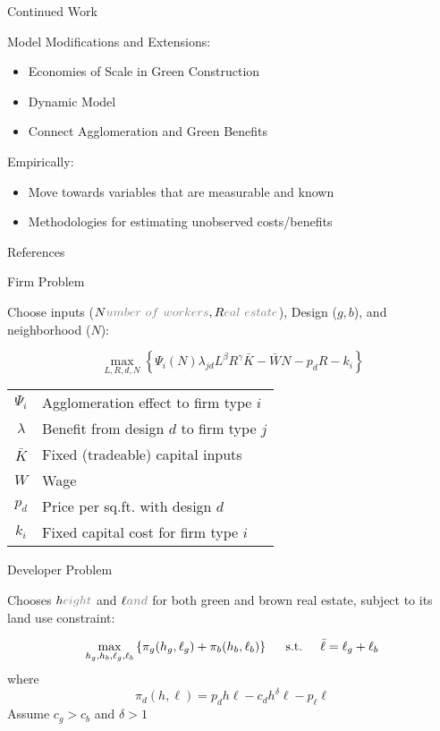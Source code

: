 \documentclass[11pt, dvipsnames, usenames]{beamer}
\begin{document}
\begin{frame}{Continued Work}

Model Modifications and Extensions:
\begin{itemize}
	\item Economies of Scale in Green Construction
	\item Dynamic Model
	\item Connect Agglomeration and Green Benefits
\end{itemize}

\vfill
Empirically:
\begin{itemize}
	\item Move towards variables that are measurable and known
	\item Methodologies for estimating unobserved costs/benefits
\end{itemize}

\end{frame}


\begin{frame}{References}
\nocite{*}

\end{frame}


\begin{frame}{Firm Problem}

Choose inputs ($N\textcolor{gray}{umber~of~workers}, R\textcolor{gray}{eal~estate}$), Design ($g, b$), and neighborhood ($N$): 

\vfill
$$\max_{L, R, d, N} \left\{ \Psi_i(N) \lambda_{jd} L^\beta R^\gamma \bar{K} - \bar{W}N - p_d R - k_{i} \right\}$$

\vfill
\centering
\begin{tabular}{c l}
$\Psi_i$ & Agglomeration effect to firm type $i$\\
$\lambda$ & Benefit from design $d$ to firm type $j$\\
$\bar{K}$ & Fixed (tradeable) capital inputs\\
$W$ & Wage\\
$p_d$ & Price per sq.ft. with design $d$\\
$k_{i}$ & Fixed capital cost for firm type $i$  
\end{tabular}

\end{frame}


\begin{frame}{Developer Problem}

Chooses $h\textcolor{gray}{eight}$ and $\ell\textcolor{gray}{and}$ for both green and brown real estate, subject to its land use constraint:

\vfill
$$\max_{h_g, h_b, \ell_g, \ell_b} \left\{ \pi_g(h_g, \ell_g) + \pi_b(h_b, \ell_b)\right\} \hspace{.5cm}\text{s.t.}\hspace{.5cm} \bar{\ell} = \ell_g + \ell_b$$ 
where
$$\pi_d(h, \ell) = p_d h\ell - c_d h^\delta \ell - p_\ell \ell$$
\vfill
Assume $c_g > c_b$ and $\delta > 1$ 

\end{frame}
\end{document}
